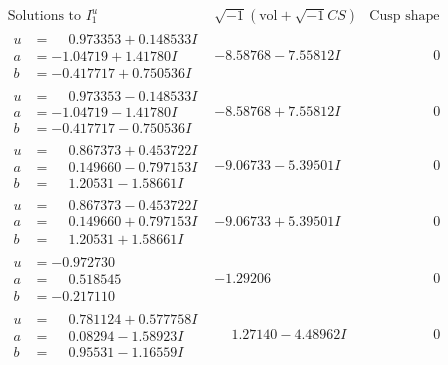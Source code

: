 \documentclass[1p]{elsarticle_modified}
\theoremstyle{definition}
\newcommand{\I}{\sqrt{-1}}
\begin{document}
$$\begin{array}{c|c|c}  
\text{Solutions to }I^u_{1}& \I (\text{vol} + \sqrt{-1}CS) & \text{Cusp shape}\\
 \hline 
\begin{aligned}
u &= \phantom{-}0.973353 + 0.148533 I \\
a &= -1.04719 + 1.41780 I \\
b &= -0.417717 + 0.750536 I\end{aligned}
 & -8.58768 - 7.55812 I & \phantom{-0.000000 } 0 \\ \hline\begin{aligned}
u &= \phantom{-}0.973353 - 0.148533 I \\
a &= -1.04719 - 1.41780 I \\
b &= -0.417717 - 0.750536 I\end{aligned}
 & -8.58768 + 7.55812 I & \phantom{-0.000000 } 0 \\ \hline\begin{aligned}
u &= \phantom{-}0.867373 + 0.453722 I \\
a &= \phantom{-}0.149660 - 0.797153 I \\
b &= \phantom{-}1.20531 - 1.58661 I\end{aligned}
 & -9.06733 - 5.39501 I & \phantom{-0.000000 } 0 \\ \hline\begin{aligned}
u &= \phantom{-}0.867373 - 0.453722 I \\
a &= \phantom{-}0.149660 + 0.797153 I \\
b &= \phantom{-}1.20531 + 1.58661 I\end{aligned}
 & -9.06733 + 5.39501 I & \phantom{-0.000000 } 0 \\ \hline\begin{aligned}
u &= -0.972730\phantom{ +0.000000I} \\
a &= \phantom{-}0.518545\phantom{ +0.000000I} \\
b &= -0.217110\phantom{ +0.000000I}\end{aligned}
 & -1.29206\phantom{ +0.000000I} & \phantom{-0.000000 } 0 \\ \hline\begin{aligned}
u &= \phantom{-}0.781124 + 0.577758 I \\
a &= \phantom{-}0.08294 - 1.58923 I \\
b &= \phantom{-}0.95531 - 1.16559 I\end{aligned}
 & \phantom{-}1.27140 - 4.48962 I & \phantom{-0.000000 } 0 \\ \hline\begin{aligned}

\end{aligned}
\end{array}$$
\end{document}
